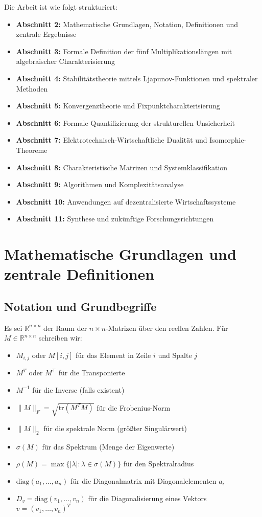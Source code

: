 \documentclass[a4paper,12pt]{article}
\theoremstyle{definition}
\begin{document}
Die Arbeit ist wie folgt strukturiert:

\begin{itemize}
\item \textbf{Abschnitt 2:} Mathematische Grundlagen, Notation, Definitionen und zentrale Ergebnisse
\item \textbf{Abschnitt 3:} Formale Definition der fünf Multiplikationslängen mit algebraischer Charakterisierung
\item \textbf{Abschnitt 4:} Stabilitätstheorie mittels Ljapunov-Funktionen und spektraler Methoden
\item \textbf{Abschnitt 5:} Konvergenztheorie und Fixpunktcharakterisierung
\item \textbf{Abschnitt 6:} Formale Quantifizierung der strukturellen Unsicherheit
\item \textbf{Abschnitt 7:} Elektrotechnisch-Wirtschaftliche Dualität und Isomorphie-Theoreme
\item \textbf{Abschnitt 8:} Charakteristische Matrizen und Systemklassifikation
\item \textbf{Abschnitt 9:} Algorithmen und Komplexitätsanalyse
\item \textbf{Abschnitt 10:} Anwendungen auf dezentralisierte Wirtschaftssysteme
\item \textbf{Abschnitt 11:} Synthese und zukünftige Forschungsrichtungen
\end{itemize}

\section{Mathematische Grundlagen und zentrale Definitionen}

\subsection{Notation und Grundbegriffe}

Es sei $\mathbb{R}^{n \times n}$ der Raum der $n \times n$-Matrizen über den reellen Zahlen. Für $M \in \mathbb{R}^{n \times n}$ schreiben wir:

\begin{itemize}
\item $M_{i,j}$ oder $M[i,j]$ für das Element in Zeile $i$ und Spalte $j$
\item $M^T$ oder $M^\top$ für die Transponierte
\item $M^{-1}$ für die Inverse (falls existent)
\item $\|M\|_F = \sqrt{\mathrm{tr}(M^T M)}$ für die Frobenius-Norm
\item $\|M\|_2$ für die spektrale Norm (größter Singulärwert)
\item $\sigma(M)$ für das Spektrum (Menge der Eigenwerte)
\item $\rho(M) = \max\{|\lambda| : \lambda \in \sigma(M)\}$ für den Spektralradius
\item $\mathrm{diag}(a_1, \ldots, a_n)$ für die Diagonalmatrix mit Diagonalelementen $a_i$
\item $D_v = \mathrm{diag}(v_1, \ldots, v_n)$ für die Diagonalisierung eines Vektors $v = (v_1, \ldots, v_n)^T$
\end{itemize}
\end{document}
